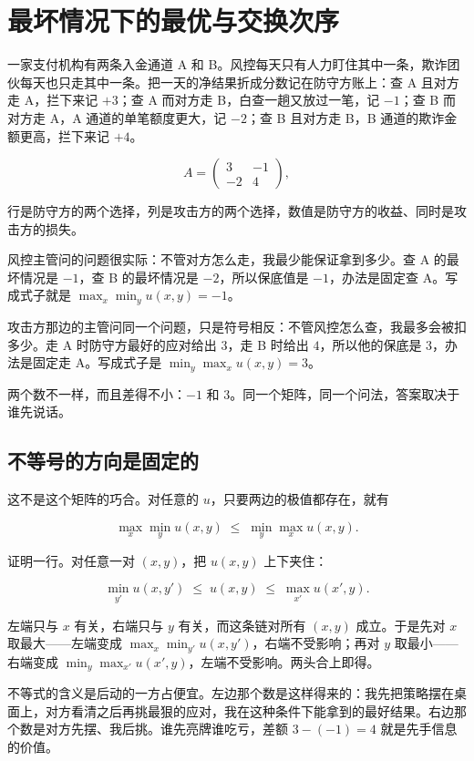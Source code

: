 \section{最坏情况下的最优与交换次序}
\label{sec:17-Constrained-Guarantees/06-Games-and-Equilibria/01}

一家支付机构有两条入金通道 A 和 B。风控每天只有人力盯住其中一条，欺诈团伙每天也只走其中一条。把一天的净结果折成分数记在防守方账上：查 A 且对方走 A，拦下来记 \(+3\)；查 A 而对方走 B，白查一趟又放过一笔，记 \(-1\)；查 B 而对方走 A，A 通道的单笔额度更大，记 \(-2\)；查 B 且对方走 B，B 通道的欺诈金额更高，拦下来记 \(+4\)。

\[
A=\begin{pmatrix}3 & -1\\ -2 & 4\end{pmatrix},
\]

行是防守方的两个选择，列是攻击方的两个选择，数值是防守方的收益、同时是攻击方的损失。

风控主管问的问题很实际：不管对方怎么走，我最少能保证拿到多少。查 A 的最坏情况是 \(-1\)，查 B 的最坏情况是 \(-2\)，所以保底值是 \(-1\)，办法是固定查 A。写成式子就是 \(\max_x\min_y u(x,y)=-1\)。

攻击方那边的主管问同一个问题，只是符号相反：不管风控怎么查，我最多会被扣多少。走 A 时防守方最好的应对给出 \(3\)，走 B 时给出 \(4\)，所以他的保底是 \(3\)，办法是固定走 A。写成式子是 \(\min_y\max_x u(x,y)=3\)。

两个数不一样，而且差得不小：\(-1\) 和 \(3\)。同一个矩阵，同一个问法，答案取决于谁先说话。

\subsection{不等号的方向是固定的}

这不是这个矩阵的巧合。对任意的 \(u\)，只要两边的极值都存在，就有

\[
\max_x\min_y u(x,y)\;\le\;\min_y\max_x u(x,y).
\]

证明一行。对任意一对 \((x,y)\)，把 \(u(x,y)\) 上下夹住：

\[
\min_{y'}u(x,y')\;\le\;u(x,y)\;\le\;\max_{x'}u(x',y).
\]

左端只与 \(x\) 有关，右端只与 \(y\) 有关，而这条链对所有 \((x,y)\) 成立。于是先对 \(x\) 取最大——左端变成 \(\max_x\min_{y'}u(x,y')\)，右端不受影响；再对 \(y\) 取最小——右端变成 \(\min_y\max_{x'}u(x',y)\)，左端不受影响。两头合上即得。

不等式的含义是后动的一方占便宜。左边那个数是这样得来的：我先把策略摆在桌面上，对方看清之后再挑最狠的应对，我在这种条件下能拿到的最好结果。右边那个数是对方先摆、我后挑。谁先亮牌谁吃亏，差额 \(3-(-1)=4\) 就是先手信息的价值。

